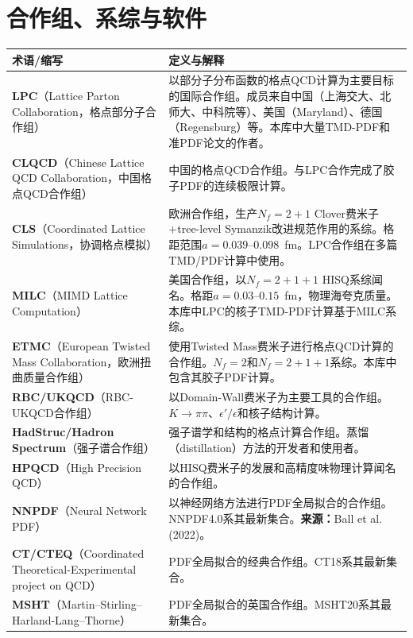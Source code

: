 \documentclass[12pt,a4paper]{ctexart}
\begin{document}
\section{合作组、系综与软件}

\begin{longtable}{p{3.5cm}p{9cm}}
\toprule
\textbf{术语/缩写} & \textbf{定义与解释} \\
\midrule
\endhead
\textbf{LPC}（Lattice Parton Collaboration，格点部分子合作组）& 以部分子分布函数的格点QCD计算为主要目标的国际合作组。成员来自中国（上海交大、北师大、中科院等）、美国（Maryland）、德国（Regensburg）等。本库中大量TMD-PDF和准PDF论文的作者。\\
\textbf{CLQCD}（Chinese Lattice QCD Collaboration，中国格点QCD合作组）& 中国的格点QCD合作组。与LPC合作完成了胶子PDF的连续极限计算。\\
\textbf{CLS}（Coordinated Lattice Simulations，协调格点模拟）& 欧洲合作组，生产$N_f=2+1$ Clover费米子+tree-level Symanzik改进规范作用的系综。格距范围$a = 0.039\text{--}0.098$~fm。LPC合作组在多篇TMD/PDF计算中使用。\\
\textbf{MILC}（MIMD Lattice Computation）& 美国合作组，以$N_f=2+1+1$ HISQ系综闻名。格距$a=0.03\text{--}0.15$~fm，物理海夸克质量。本库中LPC的核子TMD-PDF计算基于MILC系综。\\
\textbf{ETMC}（European Twisted Mass Collaboration，欧洲扭曲质量合作组）& 使用Twisted Mass费米子进行格点QCD计算的合作组。$N_f=2$和$N_f=2+1+1$系综。本库中包含其胶子PDF计算。\\
\textbf{RBC/UKQCD}（RBC-UKQCD合作组）& 以Domain-Wall费米子为主要工具的合作组。$K\to\pi\pi$、$\epsilon'/\epsilon$和核子结构计算。\\
\textbf{HadStruc/Hadron Spectrum}（强子谱合作组）& 强子谱学和结构的格点计算合作组。蒸馏（distillation）方法的开发者和使用者。\\
\textbf{HPQCD}（High Precision QCD）& 以HISQ费米子的发展和高精度味物理计算闻名的合作组。\\
\textbf{NNPDF}（Neural Network PDF）& 以神经网络方法进行PDF全局拟合的合作组。NNPDF4.0系其最新集合。\textbf{来源：}Ball et al. (2022)。\\
\textbf{CT/CTEQ}（Coordinated Theoretical-Experimental project on QCD）& PDF全局拟合的经典合作组。CT18系其最新集合。\\
\textbf{MSHT}（Martin--Stirling--Harland-Lang--Thorne）& PDF全局拟合的英国合作组。MSHT20系其最新集合。\\

\end{longtable}
\end{document}
